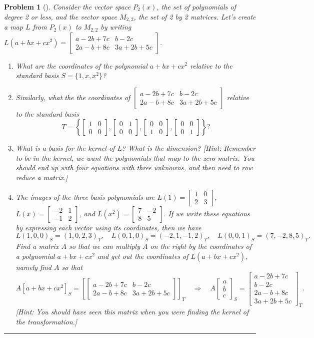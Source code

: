 \documentclass[letterpaper,oneside]{book}%
\theoremstyle{plain}
\theoremstyle{box}
\theoremstyle{problem}
\newtheorem{problemnum}{Problem}[chapter]
\newenvironment{problem}[1][]{\begin{problemnum}[#1]}{\end{problemnum}\nopagebreak\hrule\bigskip}
\newcommand{\bvec}[1]{\begin{bmatrix} #1 \end{bmatrix}}
\begin{document}
\begin{problem}
Consider the vector space $P_2(x)$, the set of polynomials of degree 2 or less, and the vector space $M_{2,2}$, the set of 2 by 2 matrices. Let's create a map $L$ from $P_2(x)$ to $M_{2,2}$ by writing $L(a+bx+cx^2)=\bvec{a-2b+7c&b-2c\\2a-b+8c&3a+2b+5c}$. 
\begin{enumerate}
 \item What are the coordinates of the polynomial $a+bx+cx^2$ relative to the standard basis $S=\{1, x, x^2\}$?  
 \item Similarly, what the the coordinates of $\bvec{a-2b+7c&b-2c\\2a-b+8c&3a+2b+5c}$ relative to the standard basis 
 $$T=\left\{\bvec{1&0\\0&0}, \bvec{0&1\\0&0}, \bvec{0&0\\1&0}, \bvec{0&0\\0&1}\right\}?$$
 \item What is a basis for the kernel of $L$? What is the dimension? [Hint: Remember to be in the kernel, we want the polynomials that map to the zero matrix. You should end up with four equations with three unknowns, and then need to row reduce a matrix.]
 \item The images of the three basis polynomials are $L(1) = \bvec{1&0\\2&3}$, $L(x) = \bvec{-2&1\\-1&2}$, and $L(x^2)=\bvec{7&-2\\8&5}$. If we write these equations by expressing each vector using its coordinates, then we have 
 $$L(1,0,0)_S = (1,0,2,3)_T, \quad L(0,1,0)_S = (-2,1,-1,2)_T,\quad L(0,0,1)_S=(7,-2,8,5)_T.$$
 Find a matrix $A$ so that we can multiply $A$ on the right by the coordinates of a polynomial $a+bx+cx^2$ and get out the coordinates of $L(a+bx+cx^2)$, namely find $A$ so that 
 $$A[a+bx+cx^2]_S=\left[\bvec{a-2b+7c&b-2c\\2a-b+8c&3a+2b+5c}\right]_T\quad\Rightarrow\quad A\bvec{a\\b\\c}_S = \bvec{a-2b+7c\\b-2c\\2a-b+8c\\3a+2b+5c}_T.$$
 [Hint: You should have seen this matrix when you were finding the kernel of the transformation.]
\end{enumerate}
\end{problem}
\end{document}
